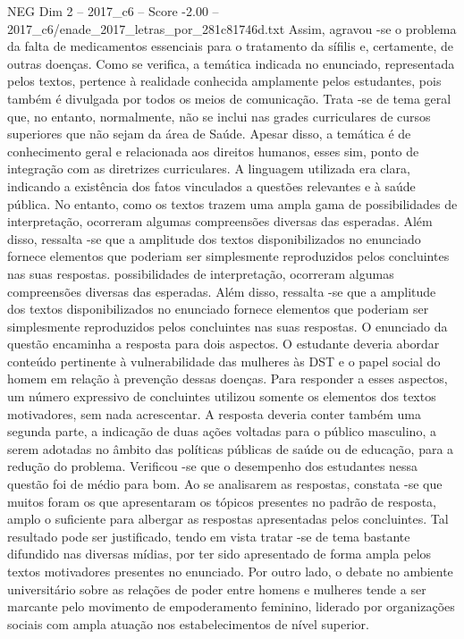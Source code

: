 \begin{textsample}{NEG Dim 2 – 2017\_c6 – Score -2.00 – 2017\_c6/enade\_2017\_letras\_por\_281c81746d.txt}
Assim, agravou -se o problema da falta de medicamentos essenciais para o tratamento da sífilis e, certamente, de outras doenças.
Como se verifica, a temática indicada no enunciado, representada pelos textos, pertence à realidade conhecida amplamente pelos estudantes, pois também é divulgada por todos os meios de comunicação.
Trata -se de tema geral que, no entanto, normalmente, não se inclui nas grades curriculares de cursos superiores que não sejam da área de Saúde.
Apesar disso, a temática é de conhecimento geral e relacionada aos direitos humanos, esses sim, ponto de integração com as diretrizes curriculares.
A linguagem utilizada era clara, indicando a existência dos fatos vinculados a questões relevantes e à saúde pública.
No entanto, como os textos trazem uma ampla gama de possibilidades de interpretação, ocorreram algumas compreensões diversas das esperadas.
Além disso, ressalta -se que a amplitude dos textos disponibilizados no enunciado fornece elementos que poderiam ser simplesmente reproduzidos pelos concluintes nas suas respostas. possibilidades de interpretação, ocorreram algumas compreensões diversas das esperadas.
Além disso, ressalta -se que a amplitude dos textos disponibilizados no enunciado fornece elementos que poderiam ser simplesmente reproduzidos pelos concluintes nas suas respostas.
O enunciado da questão encaminha a resposta para dois aspectos.
O estudante deveria abordar conteúdo pertinente à vulnerabilidade das mulheres às DST e o papel social do homem em relação à prevenção dessas doenças.
Para responder a esses aspectos, um número expressivo de concluintes utilizou somente os elementos dos textos motivadores, sem nada acrescentar.
A resposta deveria conter também uma segunda parte, a indicação de duas ações voltadas para o público masculino, a serem adotadas no âmbito das políticas públicas de saúde ou de educação, para a redução do problema.
Verificou -se que o desempenho dos estudantes nessa questão foi de médio para bom.
Ao se analisarem as respostas, constata -se que muitos foram os que apresentaram os tópicos presentes no padrão de resposta, amplo o suficiente para albergar as respostas apresentadas pelos concluintes.
Tal resultado pode ser justificado, tendo em vista tratar -se de tema bastante difundido nas diversas mídias, por ter sido apresentado de forma ampla pelos textos motivadores presentes no enunciado.
Por outro lado, o debate no ambiente universitário sobre as relações de poder entre homens e mulheres tende a ser marcante pelo movimento de empoderamento feminino, liderado por organizações sociais com ampla atuação nos estabelecimentos de nível superior.

\end{textsample}
